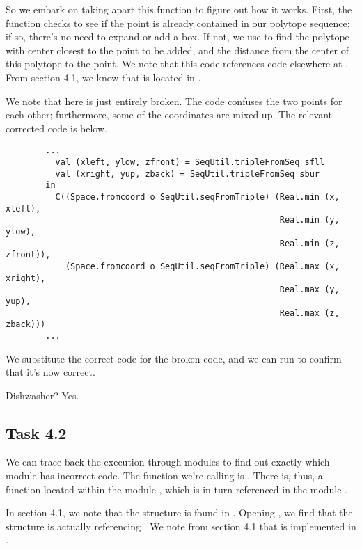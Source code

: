 \documentclass[11pt]{article}
\begin{document}
        So we embark on taking apart this function to figure out how it works.
        First, the function checks to see if the point is already contained in
        our polytope sequence; if so, there's no need to expand or add a box.
        If not, we use  to find the polytope with center
        closest to the point to be added, and the distance from the center of this
        polytope to the point. We note that this code references code elsewhere
        at . From section 4.1, we know that  is
        located in .
        
        We note that  here is just entirely broken. The code
        confuses the two points for each other; furthermore, some of the coordinates
        are mixed up. The relevant corrected code is below.
        
        \begin{verbatim}
        ...
          val (xleft, ylow, zfront) = SeqUtil.tripleFromSeq sfll
          val (xright, yup, zback) = SeqUtil.tripleFromSeq sbur
        in
          C((Space.fromcoord o SeqUtil.seqFromTriple) (Real.min (x, xleft),
                                                       Real.min (y, ylow),
                                                       Real.min (z, zfront)),
            (Space.fromcoord o SeqUtil.seqFromTriple) (Real.max (x, xright),
                                                       Real.max (y, yup),
                                                       Real.max (z, zback)))
        ...
        \end{verbatim}

        We substitute the correct code for the broken code, and we can
        run  to confirm that it's now correct. 
        
        Dishwasher? Yes.

    \subsection*{Task 4.2}
        We can trace back the execution through modules to find out exactly which
        module has incorrect code. The function we're calling is
        . There is, thus, a function  located
        within the module , which is in turn referenced in the module
        .
        
        In section 4.1, we note that the structure  is found in .
        Opening , we find that the structure 
        is actually referencing . We note from section 4.1 that
         is implemented in .
        
\end{document}

